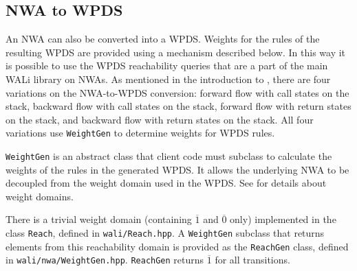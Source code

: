 \subsection{NWA to WPDS}
\label{Se:NWAtoPDS}


An NWA can also be converted into a WPDS. Weights for the rules of the
resulting WPDS are provided using a mechanism described below.  In this way
it is possible to use
the WPDS reachability queries that are a part of the main WALi library on
NWAs.  As mentioned in the introduction to , there are
four variations on the NWA-to-WPDS conversion: forward flow with call states
on the stack, backward flow with call states on the stack, forward flow with
return states on the stack, and backward flow with return states on the
stack. All four variations use \texttt{WeightGen} to determine weights for
WPDS rules.

\texttt{WeightGen} is an abstract class that client code must subclass to
calculate the weights of the rules in the generated WPDS.  It allows the
underlying NWA to be decoupled from the weight domain used in the WPDS.  See
\cite[\S4-\S5]{wali} for details about weight domains.

There is a trivial weight domain (containing $\overline{1}$ and
$\overline{0}$ only) implemented in the class \texttt{Reach}, defined in
\texttt{wali/Reach.hpp}. A \texttt{WeightGen} subclass that returns elements
from this reachability domain is provided as the \texttt{ReachGen} class,
defined in \texttt{wali/nwa/WeightGen.hpp}. \texttt{ReachGen} returns
$\overline{1}$ for all transitions.



